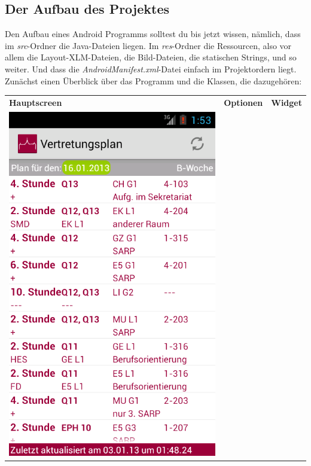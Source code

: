 \documentclass[12pt,headsepline]{scrartcl}
\begin{document}
\subsection{Der Aufbau des Projektes}
Den Aufbau eines Android Programms solltest du bis jetzt wissen, nämlich, dass im \textit{src}-Ordner die Java-Dateien liegen. Im \textit{res}-Ordner die Ressourcen, also vor allem die Layout-XLM-Dateien, die Bild-Dateien, die statischen Strings, und so weiter. Und dass die \textit{AndroidManifest.xml}-Datei einfach im Projektordern liegt.
Zunächst einen Überblick über das Programm und die Klassen, die dazugehören:
\begin{center}
\begin{longtable}{p{5cm}p{5cm}p{5cm}}
\textbf{Hauptscreen} & \textbf{Optionen} & \textbf{Widget}\\
\includegraphics[scale=0.28,keepaspectratio=true]{device-2013-01-16-103322.png}

\end{longtable}
\end{center}
\end{document}
